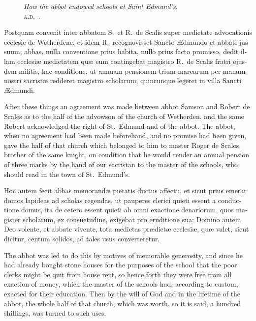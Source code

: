 \documentclass{book}
\newcommand{\blockhead}[4][]{
\begin{figure}
\centering
\vspace{#4}
\parbox{2.75cm}{\begin{center}\footnotesize \color{BrickRed} \emph{#2}\\ #1 \end{center}}
\end{figure}
}
\begin{document}
\begin{paracol}{2}
\switchcolumn*

\begin{otherlanguage}{latin}
\blockhead[\textsc{a.d}.\ .]{How the abbot endowed schools at Saint Edmund's.}{4}{-.55cm} 
Postquam convenit inter abbatem S.\ et R.\ de Scalis super medietate advocationis ecclesie de Wetherdene, et idem R.\ recognovisset Sancto \AE{}dmundo et abbati jus suum; abbas, nulla conventione prius habita, nullo prius facto promisso, dedit illam ecclesi\ae{} medietatem qu\ae{} eum contingebat magistro R.\ de Scalis fratri ejusdem militis, hac conditione, ut annuam pensionem trium marcarum per manum nostri sacrist\ae{} redderet magistro scholarum, quincunque legeret in villa Sancti \AE{}dmundi.

\end{otherlanguage}

\switchcolumn

After these things an agreement was made between abbot Samson and Robert de Scales as to the half of the advowson of the church of Wetherden, and the same Robert acknowledged the right of St.\ Edmund and of the abbot. The abbot, when no agreement had been made beforehand, and no promise had been given, gave the half of that church which belonged to him to master Roger de Scales, brother of the same knight, on condition that he would render an annual pension of three marks by the hand of our sacristan to the master of the schools, who should read in the town of St.\ Edmund's.

\switchcolumn*

\begin{otherlanguage}{latin}
Hoc autem fecit abbas memorand\ae{} pietatis ductus affectu, et sicut prius emerat domos lapideas ad scholas regendas, ut pauperes clerici quieti essent a conductione domus, ita de cetero essent quieti ab omni exactione denariorum, quos magister scholarum, ex consuetudine, exigebat pro eruditione sua; Domino autem Deo volente, et abbate vivente, tota medietas pr\ae{}dict\ae{} ecclesi\ae{}, qu\ae{} valet, sicut dicitur, centum solidos, ad tales usus converteretur.
\end{otherlanguage}

\switchcolumn

The abbot was led to do this by motives of memorable generosity, and since he had already bought stone houses for the purposes of the school that the poor clerks might be quit from house rent, so hence forth they were free from all exaction of money, which the master of the schools had, according to custom, exacted for their education. Then by the will of God and in the lifetime of the abbot, the whole half of that church, which was worth, so it is said, a hundred shillings, was turned to such uses.


\end{paracol}
\end{document}
